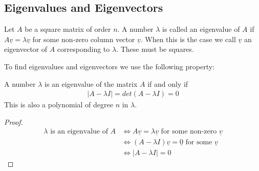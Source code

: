 \documentclass[a4paper]{article}
\theoremstyle{plain}
\theoremstyle{definition}
\newtheorem{defn}{Definition}[section]
\theoremstyle{remark}
\begin{document}
\subsection{Eigenvalues and Eigenvectors}
\begin{tcolorbox}[colback=black!3!white,colframe=black!60!white,title=\begin{defn}Eigenvalues and Eigenvectors \label{Eigenvalues}\end{defn}]
Let $A$ be a square matrix of order $n$. A number $\lambda$ is called an eigenvalue of $A$ if $A \underline{v} = \lambda \underline{v}$ for some non-zero column vector $\underline{v}$. When this is the case we call $ \underline{v}$ an eigenvector of $A$ corresponding to $\lambda$. These must be squares.
\end{tcolorbox}
To find eigenvalues and eigenvectors we use the following property: \\
\begin{tcolorbox}[colback=black!3!white,colframe=black!60!white,title=\begin{defn}Characteristic Equation \label{Characteristic Equation}\end{defn}]
A number $\lambda$ is an eigenvalue of the matrix $A$ if and only if
\begin{align}
|A - \lambda I| = det(A - \lambda I) = 0
\end{align}
This is also a polynomial of degree $n$ in $\lambda$.
\begin{proof}
	\begin{align}
		\lambda \text{ is an eigenvalue of $A$} &\iff A\underline{v} = \lambda \underline{v} \text{ for some non-zero $\underline{v}$} \\
							&\iff (A - \lambda I)\underline{v} = \underline{0} \text{ for some $\underline{v}$} \\
							& \iff |A - \lambda I | = 0
	\end{align}
\end{proof}
\end{tcolorbox}
\end{document}
